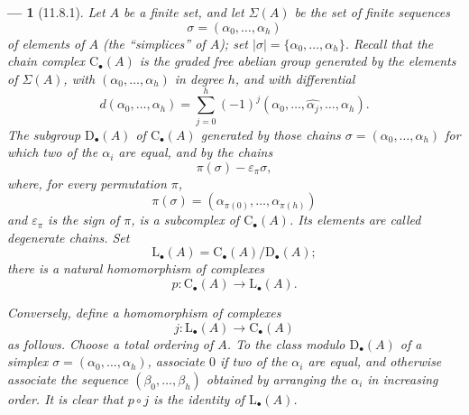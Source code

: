 \documentclass[oneside]{amsart}
\theoremstyle{ega-env-style}
\newtheorem*{env}{---}
\theoremstyle{ega-thm-env-style}
\theoremstyle{ega-defn-env-style}
\let\EGAOriginalLabel\label
\renewcommand{\label}[1]{\phantomsection\EGAOriginalLabel{#1}}
\begin{document}
\begin{env}[11.8.1]
\label{0.11.8.1}
Let $A$ be a finite set, and let $\Sigma(A)$ be the set of finite
sequences
\[
  \sigma=(\alpha_0,\ldots,\alpha_h)
\]
of elements of $A$ (the ``simplices'' of $A$); set
$|\sigma|=\{\alpha_0,\ldots,\alpha_h\}$.
Recall that the chain complex $\mathrm{C}_\bullet(A)$ is the graded free
abelian group generated by the elements of $\Sigma(A)$, with
$(\alpha_0,\ldots,\alpha_h)$ in degree $h$, and with differential
\[
  d(\alpha_0,\ldots,\alpha_h)
  =
  \sum_{j=0}^{h}(-1)^j
  (\alpha_0,\ldots,\widehat{\alpha_j},\ldots,\alpha_h).
\]
The subgroup $\mathrm{D}_\bullet(A)$ of $\mathrm{C}_\bullet(A)$ generated
by those chains $\sigma=(\alpha_0,\ldots,\alpha_h)$ for which two of the
$\alpha_i$ are equal, and by the chains
\[
  \pi(\sigma)-\varepsilon_\pi\sigma,
\]
where, for every permutation $\pi$,
\[
  \pi(\sigma)
  =
  (\alpha_{\pi(0)},\ldots,\alpha_{\pi(h)})
\]
and $\varepsilon_\pi$ is the sign of $\pi$, is a subcomplex of
$\mathrm{C}_\bullet(A)$.
Its elements are called \emph{degenerate chains}.
Set
\[
  \mathrm{L}_\bullet(A)
  =
  \mathrm{C}_\bullet(A)/\mathrm{D}_\bullet(A);
\]
there is a natural homomorphism of complexes
\[
  p:\mathrm{C}_\bullet(A)\longrightarrow\mathrm{L}_\bullet(A).
\]

Conversely, define a homomorphism of complexes
\[
  j:\mathrm{L}_\bullet(A)\longrightarrow\mathrm{C}_\bullet(A)
\]
as follows.
Choose a total ordering of $A$.
To the class modulo $\mathrm{D}_\bullet(A)$ of a simplex
$\sigma=(\alpha_0,\ldots,\alpha_h)$, associate $0$ if two of the
$\alpha_i$ are equal, and otherwise associate the sequence
$(\beta_0,\ldots,\beta_h)$ obtained by arranging the $\alpha_i$ in
increasing order.
It is clear that $p\circ j$ is the identity of
$\mathrm{L}_\bullet(A)$.
\end{env}
\end{document}
